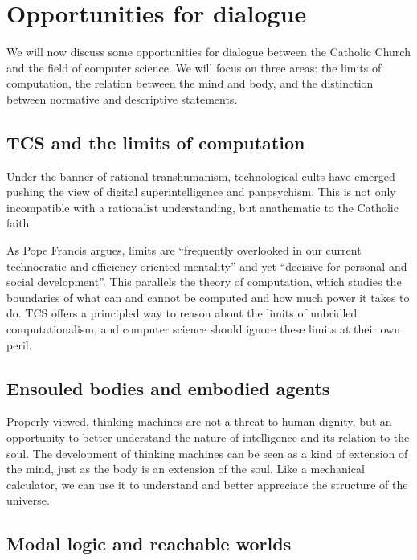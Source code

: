 \documentclass[sigplan,nonacm]{acmart}\settopmatter{printfolios=false,printccs=false,printacmref=false}
\begin{document}
  \section{Opportunities for dialogue}

  We will now discuss some opportunities for dialogue between the Catholic Church and the field of computer science. We will focus on three areas: the limits of computation, the relation between the mind and body, and the distinction between normative and descriptive statements.

  \subsection{TCS and the limits of computation}

  Under the banner of rational transhumanism, technological cults have emerged pushing the view of digital superintelligence and panpsychism. This is not only incompatible with a rationalist understanding, but anathematic to the Catholic faith.

  As Pope Francis argues, limits are ``frequently overlooked in our current technocratic and efficiency-oriented mentality'' and yet ``decisive for personal and social development''. This parallels the theory of computation, which studies the boundaries of what can and cannot be computed and how much power it takes to do. TCS offers a principled way to reason about the limits of unbridled computationalism, and computer science should ignore these limits at their own peril.


  \subsection{Ensouled bodies and embodied agents}

  Properly viewed, thinking machines are not a threat to human dignity, but an opportunity to better understand the nature of intelligence and its relation to the soul. The development of thinking machines can be seen as a kind of extension of the mind, just as the body is an extension of the soul. Like a mechanical calculator, we can use it to understand and better appreciate the structure of the universe.

  \subsection{Modal logic and reachable worlds}
\end{document}
